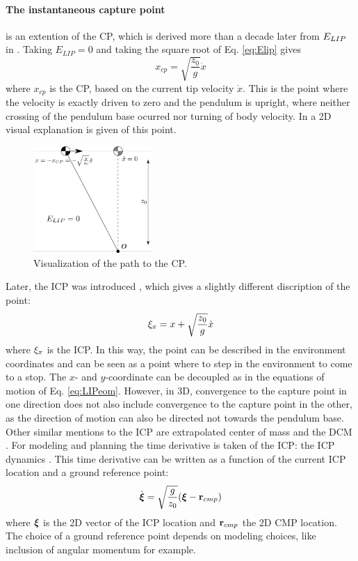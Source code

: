 \paragraph{The instantaneous capture point} is an extention of the \ac{CP}, which is derived more than a decade later from $E_{LIP}$ in \cite{pratt2006capture}. Taking $E_{LIP}=0$ and taking the square root of Eq.  \eqref{eq:Elip} gives
\begin{equation}
x_{cp}=\sqrt{ \frac{z_0}{g}}\dot{x} 
\label{eq:cp}
\end{equation}
where $x_{cp}$ is the \ac{CP}, based on the current tip velocity $\dot{x}$. This is the point where the velocity is exactly driven to zero and the pendulum is upright, where neither crossing of the pendulum base ocurred nor turning of body velocity. In  a \ac{2D} visual explanation is given of this point.
\begin{figure}[h]
\centering
\includegraphics[width=0.4\textwidth]{STYLESTUFF/2DICP.png}
\caption{Visualization of the path to the \ac{CP}. }
\label{fig:2dicp}
\end{figure}
\paraskip
Later, the \ac{ICP} was introduced \cite{koolen2012capturability}, which gives a slightly different discription of the point:
\begin{equation}
\xi_x=x+\sqrt{ \frac{z_0}{g}}\dot{x} 
\label{eq:icp}
\end{equation}
where $\xi_x$ is the \ac{ICP}. In this way, the point can be described in the environment coordinates and can be seen as a point where to step in the environment to come to a stop.
The $x$- and $y$-coordinate can be decoupled as in the equations of motion of Eq. \eqref{eq:LIPeom}. However, in \ac{3D}, convergence to the capture point in one direction does not also include convergence to the capture point in the other, as the direction of motion can also be directed not towards the pendulum base. Other similar mentions to the \ac{ICP} are extrapolated center of mass \cite{hof2008extrapolated} and the \ac{DCM} \cite{takenaka2009real}. 
\paraskip
For modeling and planning the time derivative is taken of the \ac{ICP}: the \ac{ICP} dynamics \cite{koolen2012capturability}. This time derivative can be written as a function of the current \ac{ICP} location and a ground reference point:
\begin{equation}\label{eq:icpdyn}
\dot{\boldsymbol{\xi}}=\sqrt{ \frac{g}{z_0}}(\boldsymbol{\xi}-\mathbf{r}_{cmp})
\end{equation}
where $\boldsymbol{\xi}$ is the \ac{2D} vector of the \ac{ICP} location and $\mathbf{r}_{cmp}$ the \ac{2D} \ac{CMP} location. The choice of a ground reference point depends on modeling choices, like inclusion of angular momentum for example.

